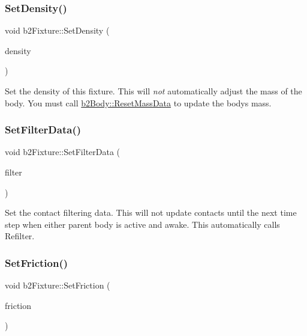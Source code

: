 \subsubsection{\texorpdfstring{Set\+Density()}{SetDensity()}}
{\footnotesize\ttfamily void b2\+Fixture\+::\+Set\+Density (\begin{DoxyParamCaption}\item[{float32}]{density }\end{DoxyParamCaption})\hspace{0.3cm}{\ttfamily [inline]}}

Set the density of this fixture. This will {\itshape not} automatically adjust the mass of the body. You must call \hyperlink{classb2_body_a109d8567c6ae84c61fce2919fb209c63}{b2\+Body\+::\+Reset\+Mass\+Data} to update the body\textquotesingle{}s mass. \mbox{\label{classb2_fixture_a2c5e0d12c174927a4ad550459be334ad}} 
\subsubsection{\texorpdfstring{Set\+Filter\+Data()}{SetFilterData()}}
{\footnotesize\ttfamily void b2\+Fixture\+::\+Set\+Filter\+Data (\begin{DoxyParamCaption}\item[{const \hyperlink{structb2_filter}{b2\+Filter} \&}]{filter }\end{DoxyParamCaption})}

Set the contact filtering data. This will not update contacts until the next time step when either parent body is active and awake. This automatically calls Refilter. \mbox{\label{classb2_fixture_ad0cd91eef5858c8ef1d6b62cc2a34ea2}} 
\subsubsection{\texorpdfstring{Set\+Friction()}{SetFriction()}}
{\footnotesize\ttfamily void b2\+Fixture\+::\+Set\+Friction (\begin{DoxyParamCaption}\item[{float32}]{friction }\end{DoxyParamCaption})\hspace{0.3cm}{\ttfamily [inline]}}


